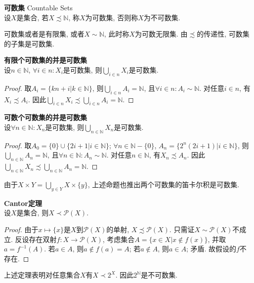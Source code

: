 \begin{dfn} \textbf{可数集} Countable Sets\\
设$X$是集合, 若$X\precsim \mathbb{N}$, 称$X$为可数集, 否则称$X$为不可数集.
\end{dfn}
可数集或者是有限集, 或者$X\sim \mathbb{N}$, 此时称$X$为可数无限集. 由$\precsim$的传递性, 可数集的子集是可数集. 

\begin{pro} \textbf{有限个可数集的并是可数集}\\
设$n\in \mathbb{N}$, $\forall i\in n: X_i$是可数集, 则$\bigcup_{i\in n} X_i$是可数集. 
\end{pro}
\begin{proof}
取$A_i=\{kn+i\vert k\in \mathbb{N}\}$, 则$\bigcup_{i\in n} A_i=\mathbb{N}$, 且$\forall i\in n: A_i\sim \mathbb{N}$. 对任意$i\in n$, 有$X_i\precsim A_i$. 因此$\bigcup_{i\in n} X_i \precsim \bigcup_{i\in n} A_i = \mathbb{N}$. 
\end{proof}

\begin{pro} \textbf{可数个可数集的并是可数集}\\
设$\forall n\in \mathbb{N}: X_n$是可数集, 则$\bigcup_{n\in \mathbb{N}} X_n$是可数集. 
\end{pro}
\begin{proof}
取$A_0=\{0\}\cup \{2i+1\vert i\in \mathbb{N}\}$; $\forall n\in \mathbb{N}-\{0\}$, $A_n=\{2^n(2i+1)\vert i\in \mathbb{N}\}$, 则$\bigcup_{n\in \mathbb{N}} A_n=\mathbb{N}$, 且$\forall n\in \mathbb{N}: A_n\sim \mathbb{N}$. 对任意$n\in \mathbb{N}$, 有$X_n\precsim A_n$. 因此$\bigcup_{n\in \mathbb{N}} X_n \precsim \bigcup_{n\in \mathbb{N}} A_n = \mathbb{N}$. 
\end{proof}
由于$X\times Y=\bigcup_{y\in Y} X\times \{y\}$, 上述命题也推出两个可数集的笛卡尔积是可数集. 

\begin{thm} \textbf{Cantor定理}\\
设$X$是集合, 则$X\prec \mathcal{P}(X)$. 
\end{thm}
\begin{proof}
由于$x\mapsto \{x\}$是$X$到$\mathcal{P}(X)$的单射, $X\precsim \mathcal{P}(X)$. 只需证$X\sim \mathcal{P}(X)$不成立. 反设存在双射$f:X\to \mathcal{P}(X)$, 考虑集合$A=\{x\in X\vert x\notin f(x)\}$, 并取$a=f^{-1}(A)$. 若$a\in A$, 则$a\notin f(a)=A$; 若$a\notin A$, 则$a\in A$; 矛盾. 故假设的$f$不存在. 
\end{proof}
上述定理表明对任意集合$X$有$X\prec 2^{X}$. 因此$2^\mathbb{N}$是不可数集. 

